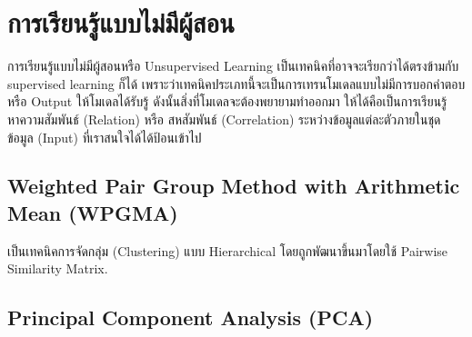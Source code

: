 

\chapter{การเรียนรู้แบบไม่มีผู้สอน}
\label{ch:unsup_ml}

การเรียนรู้แบบไม่มีผู้สอนหรือ Unsupervised Learning เป็นเทคนิคที่อาจจะเรียกว่าได้ตรงข้ามกับ supervised learning ก็ได้
เพราะว่าเทคนิคประเภทนี้จะเป็นการเทรนโมเดลแบบไม่มีการบอกคำตอบหรือ Output ให้โมเดลได้รับรู้ ดังนั้นสิ่งที่โมเดลจะต้องพยายามทำออกมา
ให้ได้คือเป็นการเรียนรู้หาความสัมพันธ์ (Relation) หรือ สหสัมพันธ์ (Correlation) ระหว่างข้อมูลแต่ละตัวภายในชุดข้อมูล (Input) 
ที่เราสนใจได้ได้ป้อนเข้าไป

\section{Weighted Pair Group Method with Arithmetic Mean (WPGMA)}

เป็นเทคนิคการจัดกลุ่ม (Clustering) แบบ Hierarchical โดยถูกพัฒนาขึ้นมาโดยใช้ Pairwise Similarity Matrix.\cite{sokal1958} 

\section{Principal Component Analysis (PCA)}

